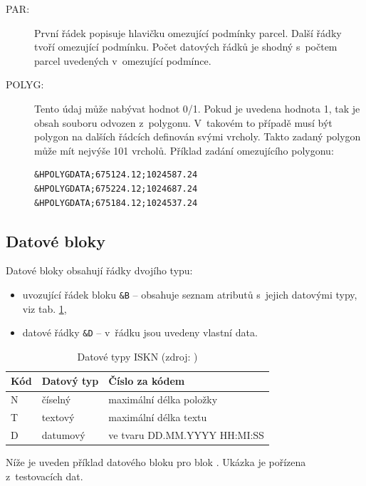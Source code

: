 \documentclass[a4paper,12pt,oneside]{book}
\begin{document}
\begin{description}
 \item[PAR:] První řádek popisuje hlavičku omezující podmínky parcel. Další řádky tvoří omezující podmínku. Počet datových řádků je shodný s~počtem parcel uvedených v~omezující podmínce.
 
 \item[POLYG:] Tento údaj může nabývat hodnot 0/1. Pokud je uvedena hodnota 1, tak je obsah souboru odvozen z~polygonu. V~takovém to případě musí být polygon na dalších řádcích definován svými vrcholy. Takto zadaný polygon může mít nejvýše 101 vrcholů. Příklad zadání omezujícího polygonu:
 
 \begin{lstlisting}
&HPOLYGDATA;675124.12;1024587.24
&HPOLYGDATA;675224.12;1024687.24
&HPOLYGDATA;675184.12;1024537.24
 \end{lstlisting} 
\end{description}

\subsection{Datové bloky}

Datové bloky obsahují řádky dvojího typu:

\begin{itemize}
 \item uvozující řádek bloku \texttt{\&B} -- obsahuje seznam atributů s~jejich datovými typy, viz tab. \ref{t_datove_typy},
 \item datové řádky \texttt{\&D} -- v~řádku jsou uvedeny vlastní data.
\end{itemize}

\begin{table}[htbp]
\centering
\caption[Datové typy ISKN]{Datové typy ISKN (zdroj: \cite{dp_landa})}
\begin{tabular}{lll}
\toprule
\textbf{Kód} & \textbf{Datový typ} & \textbf{Číslo za kódem} \\ 
\midrule
N & číselný & maximální délka položky \\ 
T & textový & maximální délka textu \\ 
D & datumový & ve tvaru DD.MM.YYYY HH:MI:SS \\ 
\bottomrule
\end{tabular}
\label{t_datove_typy}
\end{table}

Níže je uveden příklad datového bloku pro blok . Ukázka je pořízena z~testovacích dat.
\end{document}
